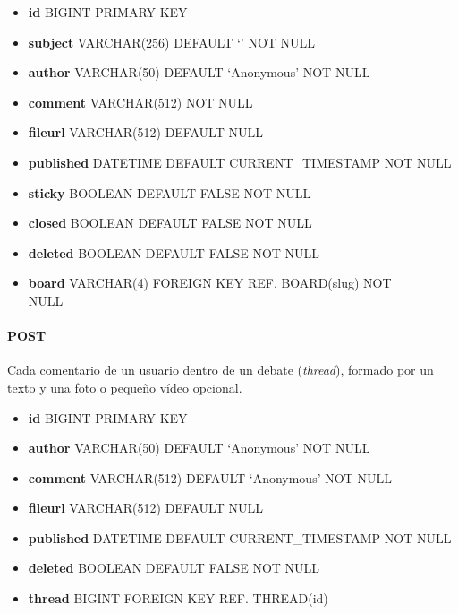\documentclass[12pt,a4paper,titlepage]{article}
\begin{document}
    \begin{itemize}
        \item \textbf{id} BIGINT PRIMARY KEY
        \item \textbf{subject} VARCHAR(256) DEFAULT `' NOT NULL
        \item \textbf{author} VARCHAR(50) DEFAULT `Anonymous' NOT NULL
        \item \textbf{comment} VARCHAR(512) NOT NULL
        \item \textbf{fileurl} VARCHAR(512) DEFAULT NULL
        \item \textbf{published} DATETIME DEFAULT CURRENT\_TIMESTAMP NOT NULL
        \item \textbf{sticky} BOOLEAN DEFAULT FALSE NOT NULL
        \item \textbf{closed} BOOLEAN DEFAULT FALSE NOT NULL
        \item \textbf{deleted} BOOLEAN DEFAULT FALSE NOT NULL
        \item \textbf{board} VARCHAR(4) FOREIGN KEY REF. BOARD(slug) NOT\\NULL
    \end{itemize}

    \paragraph{POST} Cada comentario de un usuario dentro de un debate (\textit{thread}), formado por un texto y una foto o pequeño vídeo opcional.

    \begin{itemize}
        \item \textbf{id} BIGINT PRIMARY KEY
        \item \textbf{author} VARCHAR(50) DEFAULT `Anonymous' NOT NULL
        \item \textbf{comment} VARCHAR(512) DEFAULT `Anonymous' NOT NULL
        \item \textbf{fileurl} VARCHAR(512) DEFAULT NULL
        \item \textbf{published} DATETIME DEFAULT CURRENT\_TIMESTAMP NOT NULL
        \item \textbf{deleted} BOOLEAN DEFAULT FALSE NOT NULL
        \item \textbf{thread} BIGINT FOREIGN KEY REF. THREAD(id)
    \end{itemize}

    
\end{document}
